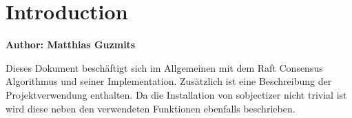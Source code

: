 \chapter{Introduction}

\textbf{Author: Matthias Guzmits}

\vspace{2mm}

Dieses Dokument beschäftigt sich im Allgemeinen mit dem Raft Consensus Algorithmus und
seiner Implementation. Zusätzlich ist eine Beschreibung der Projektverwendung enthalten.
Da die Installation von sobjectizer nicht trivial ist wird diese neben den verwendeten Funktionen
ebenfalls beschrieben.
